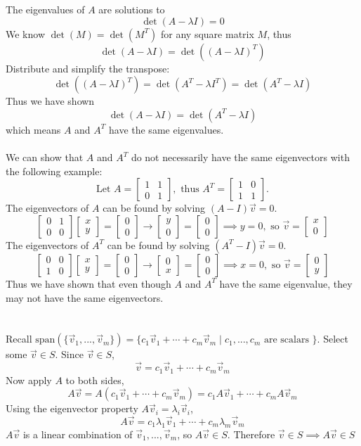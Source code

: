 \documentclass[]{article}
\newcommand{\bmat}[1]{\begin{bmatrix}#1\end{bmatrix}}
\begin{document}
    \section{}
    The eigenvalues of $A$ are solutions to
    \[ \det(A-\lambda I) = 0 \]
    We know $\det(M) = \det(M^T)$ for any square matrix $M$, thus
    \[ \det(A-\lambda I) = \det((A - \lambda I)^T)\]
    Distribute and simplify the transpose:
    \[\det((A-\lambda I)^T) = \det(A^T - \lambda I^T) = \det(A^T - \lambda I) \]
    Thus we have shown
    \[ \det(A-\lambda I) = \det(A^T - \lambda I) \]
    which means $A$ and $A^T$ have the same eigenvalues.\\
    \\
    We can show that $A$ and $A^T$ do not necessarily have the same eigenvectors with the following example:
    \[ \text{Let } A = \bmat{1&1\\0&1}, \text{ thus } A^T = \bmat{1&0\\1&1}. \]
    The eigenvectors of $A$ can be found by solving $(A-I)\vec{v} = 0$.
    \[ \bmat{0&1\\0&0}\bmat{x\\y} = \bmat{0\\0} \longrightarrow \bmat{y\\0} = \bmat{0\\0} \implies y = 0, \text{ so } \vec{v} = \bmat{x\\0}\]
    The eigenvectors of $A^T$ can be found by solving $(A^T-I)\vec{v} = 0$.
    \[ \bmat{0&0\\1&0}\bmat{x\\y} = \bmat{0\\0} \longrightarrow \bmat{0\\x} = \bmat{0\\0} \implies x = 0, \text{ so } \vec{v} = \bmat{0\\y} \]
    Thus we have shown that even though $A$ and $A^T$ have the same eigenvalue, they may not have the same eigenvectors.

    \section{}
    Recall $\text{span}(\{ \vec{v}_1,...,\vec{v}_m \}) = \{ c_1\vec{v}_1 + \cdots + c_m\vec{v}_m \; | \; c_1,...,c_m \text{ are scalars } \}$. Select some $\vec{v} \in S$. Since $\vec{v} \in S$,
    \[ \vec{v} = c_1\vec{v}_1 + \cdots + c_m\vec{v}_m \]
    Now apply $A$ to both sides,
    \[ A\vec{v} = A(c_1\vec{v}_1 + \cdots + c_m\vec{v}_m) = c_1A\vec{v}_1 + \cdots + c_mA\vec{v}_m \]
    Using the eigenvector property $A\vec{v}_i = \lambda_i\vec{v}_i$,
    \[ A\vec{v} = c_1\lambda_1\vec{v}_1 + \cdots + c_m\lambda_m\vec{v}_m \]
    $A\vec{v}$ is a linear combination of $\vec{v}_1,...,\vec{v}_m$, so $A\vec{v} \in S$. Therefore $\vec{v} \in S \implies A\vec{v} \in S$
    
\end{document}

